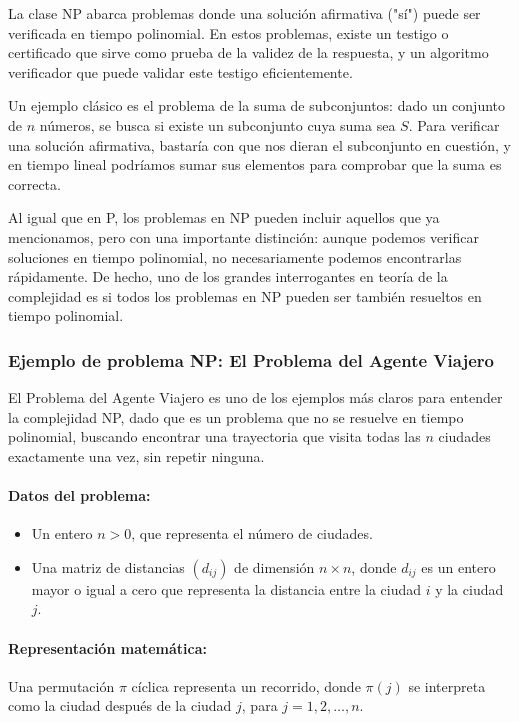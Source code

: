 \documentclass[12pt,titlepage,twoside,openright]{book}
\begin{document}
La clase NP abarca problemas donde una solución afirmativa ("sí") puede ser verificada en tiempo polinomial. En estos problemas, existe un testigo o certificado que sirve como prueba de la validez de la respuesta, y un algoritmo verificador que puede validar este testigo eficientemente.

Un ejemplo clásico es el problema de la suma de subconjuntos: dado un conjunto de $n$ números, se busca si existe un subconjunto cuya suma sea $S$. Para verificar una solución afirmativa, bastaría con que nos dieran el subconjunto en cuestión, y en tiempo lineal podríamos sumar sus elementos para comprobar que la suma es correcta.

Al igual que en P, los problemas en NP pueden incluir aquellos que ya mencionamos, pero con una importante distinción: aunque podemos verificar soluciones en tiempo polinomial, no necesariamente podemos encontrarlas rápidamente. De hecho, uno de los grandes interrogantes en teoría de la complejidad es si todos los problemas en NP pueden ser también resueltos en tiempo polinomial.

\subsubsection{Ejemplo de problema NP: El Problema del Agente Viajero}

El Problema del Agente Viajero es uno de los ejemplos más claros para entender la complejidad NP, dado que es un problema que no se resuelve en tiempo polinomial, buscando encontrar una trayectoria que visita todas las $n$ ciudades exactamente una vez, sin repetir ninguna.

\paragraph{Datos del problema:}
\begin{itemize}
    \item Un entero $n > 0$, que representa el número de ciudades.
    \item Una matriz de distancias $(d_{ij})$ de dimensión $n \times n$, donde $d_{ij}$ es un entero mayor o igual a cero que representa la distancia entre la ciudad $i$ y la ciudad $j$.
\end{itemize}

\paragraph{Representación matemática:}
Una permutación $\pi$ cíclica representa un recorrido, donde $\pi(j)$ se interpreta como la ciudad después de la ciudad $j$, para $j = 1, 2, \ldots, n$.
\end{document}
